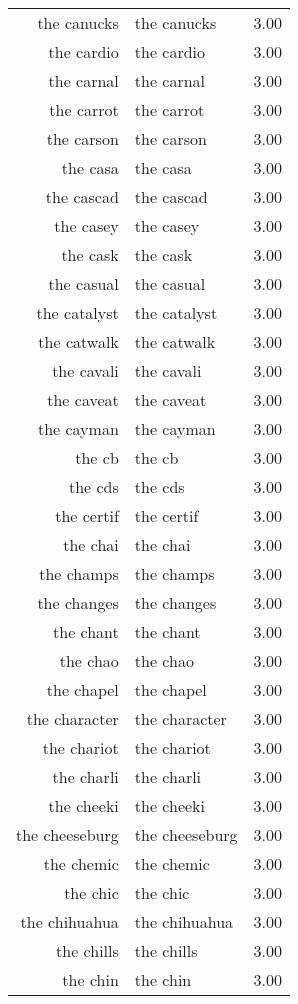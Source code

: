 \begin{table}[ht]
\begin{tabular}{rlr}
  the canucks & the canucks & 3.00 \\ 
  the cardio & the cardio & 3.00 \\ 
  the carnal & the carnal & 3.00 \\ 
  the carrot & the carrot & 3.00 \\ 
  the carson & the carson & 3.00 \\ 
  the casa & the casa & 3.00 \\ 
  the cascad & the cascad & 3.00 \\ 
  the casey & the casey & 3.00 \\ 
  the cask & the cask & 3.00 \\ 
  the casual & the casual & 3.00 \\ 
  the catalyst & the catalyst & 3.00 \\ 
  the catwalk & the catwalk & 3.00 \\ 
  the cavali & the cavali & 3.00 \\ 
  the caveat & the caveat & 3.00 \\ 
  the cayman & the cayman & 3.00 \\ 
  the cb & the cb & 3.00 \\ 
  the cds & the cds & 3.00 \\ 
  the certif & the certif & 3.00 \\ 
  the chai & the chai & 3.00 \\ 
  the champs & the champs & 3.00 \\ 
  the changes & the changes & 3.00 \\ 
  the chant & the chant & 3.00 \\ 
  the chao & the chao & 3.00 \\ 
  the chapel & the chapel & 3.00 \\ 
  the character & the character & 3.00 \\ 
  the chariot & the chariot & 3.00 \\ 
  the charli & the charli & 3.00 \\ 
  the cheeki & the cheeki & 3.00 \\ 
  the cheeseburg & the cheeseburg & 3.00 \\ 
  the chemic & the chemic & 3.00 \\ 
  the chic & the chic & 3.00 \\ 
  the chihuahua & the chihuahua & 3.00 \\ 
  the chills & the chills & 3.00 \\ 
  the chin & the chin & 3.00 \\ 

\end{tabular}
\end{table}
